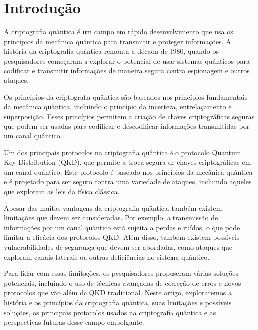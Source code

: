 \chapter{Introdução}

A criptografia quântica é um campo em rápido desenvolvimento que usa os princípios da mecânica quântica para transmitir e proteger informações. A história da criptografia quântica remonta à década de 1980, quando os pesquisadores começaram a explorar o potencial de usar sistemas quânticos para codificar e transmitir informações de maneira segura contra espionagem e outros ataques.

Os princípios da criptografia quântica são baseados nos princípios fundamentais da mecânica quântica, incluindo o princípio da incerteza, entrelaçamento e superposição. Esses princípios permitem a criação de chaves criptográficas seguras que podem ser usadas para codificar e descodificar informações transmitidas por um canal quântico.

Um dos principais protocolos na criptografia quântica é o protocolo Quantum Key Distribution (QKD), que permite a troca segura de chaves criptográficas em um canal quântico. Este protocolo é baseado nos princípios da mecânica quântica e é projetado para ser seguro contra uma variedade de ataques, incluindo aqueles que exploram as leis da física clássica.

Apesar das muitas vantagens da criptografia quântica, também existem limitações que devem ser consideradas. Por exemplo, a transmissão de informações por um canal quântico está sujeita a perdas e ruídos, o que pode limitar a eficácia dos protocolos QKD. Além disso, também existem possíveis vulnerabilidades de segurança que devem ser abordadas, como ataques que exploram canais laterais ou outras deficiências no sistema quântico.

Para lidar com essas limitações, os pesquisadores propuseram várias soluções potenciais, incluindo o uso de técnicas avançadas de correção de erros e novos protocolos que vão além do QKD tradicional. Neste artigo, exploraremos a história e os princípios da criptografia quântica, suas limitações e possíveis soluções, os principais protocolos usados na criptografia quântica e as perspectivas futuras desse campo empolgante.

\newpage
